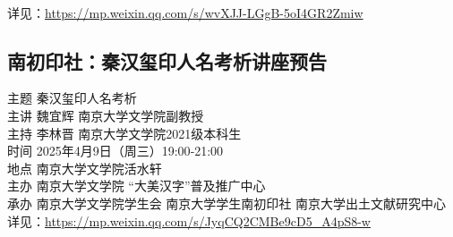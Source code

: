 \documentclass[letterpaper, 12pt]{article}
\begin{document}
\begin{multicols}{2}
\\详见：\url{https://mp.weixin.qq.com/s/wvXJJ-LGgB-5oI4GR2Zmiw}
\subsection{南初印社：秦汉玺印人名考析讲座预告}
主题 秦汉玺印人名考析
\\主讲 魏宜辉 南京大学文学院副教授
\\主持 李林晋 南京大学文学院2021级本科生
\\时间 2025年4月9日（周三）19:00‐21:00
\\地点 南京大学文学院活水轩
\\主办 南京大学文学院 “大美汉字”普及推广中心
\\承办 南京大学文学院学生会 南京大学学生南初印社 南京大学出土文献研究中心
\\详见：\url{https://mp.weixin.qq.com/s/JyqCQ2CMBe9cD5_A4pS8-w}
\end{multicols}
\end{document}

